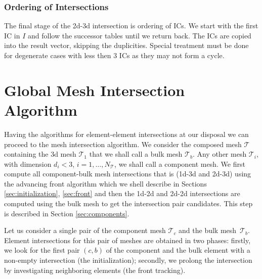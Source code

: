 \subsubsection{Ordering of Intersections}
\label{sec:ordering}
The final stage of the 2d-3d intersection is ordering of ICs. We start with the first IC in $I$ and follow the 
successor tables until we return back. The ICs are copied into the result vector, skipping the duplicities.
Special treatment must be done for degenerate cases with less then $3$ ICs as they may not form a cycle.
  

\section{Global Mesh Intersection Algorithm}
\label{sec:front_advancing}
Having the algorithms for element-element intersections at our disposal we can proceed to the mesh intersection algorithm. 
We consider the composed mesh $\mathcal T$ containing the 3d mesh $\mathcal T_1$ that we shall call a bulk mesh $\mathcal T_b$. Any other 
mesh $\mathcal T_i$, with dimension $d_i < 3$, $i=1,\dots, N_{\mathcal T}$, we shall call a component mesh. 
We first compute all component-bulk mesh intersections that is (1d-3d and 2d-3d) using the advancing front algorithm which we shell describe in Sections 
\ref{sec:initialization}, \ref{sec:front} and then the 1d-2d and 2d-2d 
intersections are computed using the bulk mesh to get the intersection pair candidates. This step is described in Section \ref{sec:components}.

Let us consider a single pair of the component mesh $\mathcal T_c$ and the bulk mesh~$\mathcal T_b$. 
Element intersections for this pair of meshes are obtained in two phases: firstly, we look for the 
first pair $(c,b)$ of the component and the bulk element with a non-empty intersection (the initialization); 
secondly, we prolong the intersection by investigating neighboring elements (the front tracking).




